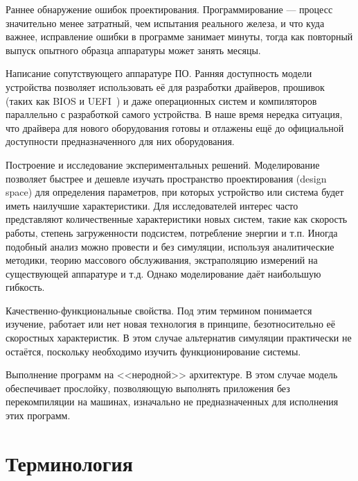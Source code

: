 \begin{description*}
    
\item[Раннее обнаружение ошибок проектирования.] Программирование --- процесс значительно менее затратный, чем испытания реального железа, и что куда важнее, исправление ошибки в программе занимает минуты, тогда как повторный выпуск опытного образца аппаратуры может занять месяцы. 

\item[Написание сопутствующего аппаратуре ПО.] Ранняя доступность модели устройства позволяет использовать её для разработки драйверов, прошивок (таких как BIOS и UEFI~\cite{uefi-itj}) и даже операционных систем и компиляторов параллельно с разработкой самого устройства. В наше время нередка ситуация, что драйвера для нового оборудования готовы и отлажены ещё до официальной доступности предназначенного для них оборудования.

\item[Построение и исследование экспериментальных решений.] Моделирование позволяет быстрее и дешевле  изучать пространство проектирования (\abbr design space) для определения параметров, при которых устройство или система будет иметь наилучшие характеристики. Для исследователей интерес часто представляют количественные характеристики новых систем, такие как скорость работы, степень загруженности подсистем, потребление энергии и т.п. Иногда подобный анализ можно провести и без симуляции, используя аналитические методики, теорию массового обслуживания, экстраполяцию измерений на существующей аппаратуре и т.д. Однако моделирование даёт наибольшую гибкость.

\item[Качественно-функциональные свойства.] Под этим тер\-ми\-ном понимается изучение, работает или нет новая технология в принципе, безотносительно её скоростных характеристик. В этом случае альтернатив симуляции практически не остаётся, поскольку необходимо изучить функционирование системы.

\item[Выполнение программ на <<неродной>> архитектуре.] В этом случае модель обеспечивает прослойку, позволяющую выполнять приложения без перекомпиляции на машинах, изначально не предназначенных для исполнения этих программ. 

\end{description*}

\section{Терминология}

